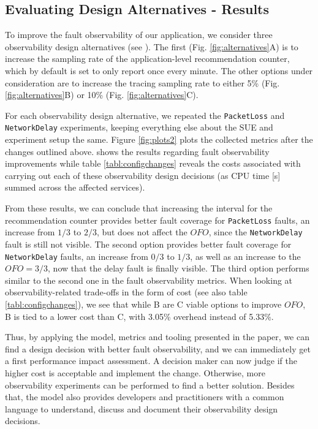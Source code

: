 \subsection{Evaluating Design Alternatives - Results}
To improve the fault observability of our application, we consider three observability design alternatives (see ). The first (Fig. \ref{fig:alternatives}A) is to increase the sampling rate of the application-level recommendation counter, which by default is set to only report once every minute. The other options under consideration are to increase the tracing sampling rate to either 5\% (Fig. \ref{fig:alternatives}B) or 10\% (Fig. \ref{fig:alternatives}C). 

For each observability design alternative, we repeated the  \texttt{PacketLoss} and \texttt{NetworkDelay} experiments, keeping everything else about the SUE and experiment setup the same. 
Figure \ref{fig:plots2} plots the collected metrics after the changes outlined above.  shows the results regarding fault observability improvements while table  \ref{tabl:configchanges} reveals the costs associated with carrying out each of these observability design decisions (as CPU time [s] summed across the affected services). 

From these results, we can conclude that increasing the interval for the recommendation counter provides better fault coverage for \texttt{PacketLoss} faults, an increase from $1/3$ to $2/3$, but does not affect the $OFO$, since the \texttt{NetworkDelay} fault is still not visible. The second option provides better fault coverage for \texttt{NetworkDelay} faults, an increase from $0/3$ to $1/3$, as well as an increase to the $OFO = 3/3$, now that the delay fault is finally visible. The third option performs similar to the second one in the fault observability metrics. When looking at observability-related trade-offs in the form of cost (see also table \ref{tabl:configchanges}), we see that while B are C viable options to improve $OFO$, B is tied to a lower cost than C, with 3.05\%  overhead instead of 5.33\%. 

Thus, by applying the model, metrics and tooling presented in the paper, we can find a design decision with better fault observability, and we can immediately get a first performance impact assessment. A decision maker can now judge if the higher cost is acceptable and implement the change. Otherwise, more observability experiments can be performed to find a better solution.
Besides that, the model also provides developers and practitioners with a common language to understand, discuss and document their observability design decisions.


